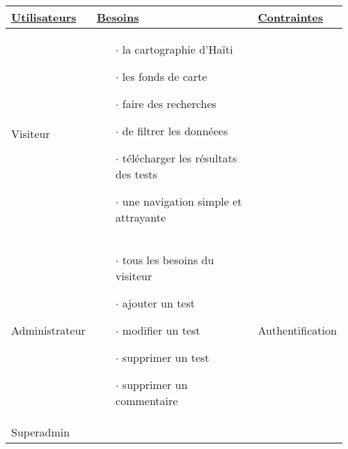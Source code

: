  
        \par    
        \begin{table}
                \centering
                \begin{tabular}{|p{0.21\linewidth}|p{0.54\linewidth}|p{0.21\linewidth}|}
                \hline
                        \textbf{\underline{Utilisateurs}} & \textbf{\underline{Besoins}} & 
                        \textbf{\underline{Contraintes}}  \\
                        \hline
                                Visiteur & 
                                \begin{itemize}
                                         \item[$\cdot$]  la cartographie d'Haïti
                                         \item[$\cdot$]  les fonds de carte
                                         \item[$\cdot$]  faire des recherches
                                         \item[$\cdot$]  de filtrer les donnéees
                                         \item[$\cdot$]  télécharger les résultats des tests
                                         \item[$\cdot$]  une navigation simple et attrayante
                                \end{itemize} & 
                                 \\
                        \hline
                                Administrateur & 
                                \begin{itemize}
                                        \item[$\cdot$]  tous les besoins du visiteur
                                        \item[$\cdot$]  ajouter un test
                                        \item[$\cdot$]  modifier un test
                                        \item[$\cdot$]  supprimer un test
                                        \item[$\cdot$]  supprimer un commentaire
                                \end{itemize} & 
                                Authentification \\
                        \hline
                                Superadmin & 
                                \begin{itemize}

\end{itemize}
\end{tabular}
\end{table}
